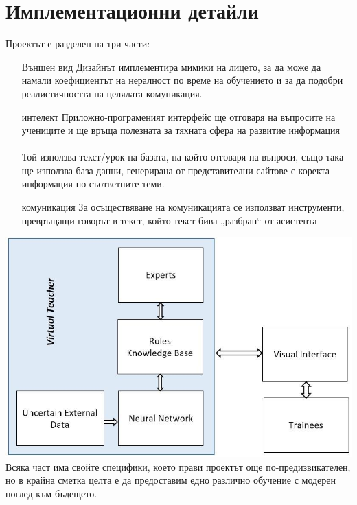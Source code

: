 \documentclass[a4paper, 12pt]{article}
\begin{document}
	\section{Имплементационни детайли}%
		Проектът е разделен на три части: %
		\begin{itemize}
			\item[Външен вид] Дизайнът имплементира мимики на лицето, за да може да намали коефициентът на нералност по време на обучението и за да подобри реалистичността на целялата комуникация. 
			\item[интелект] Приложно-програменият интерфейс ще отговаря на въпросите на учениците и ще връща полезната за тяхната сфера на развитие информация \\ \\ Той използва текст/урок на базата, на който отговаря на въпроси, също така ще използва база данни, генерирана от представителни сайтове с коректа информация по съответните теми.
			\item[комуникация] За осъществяване на комуникацията се използват инструменти, превръщащи говорът в текст, който текст бива „разбран“ от асистента 
		\end{itemize}
		{\centering
			\includegraphics[width=\textwidth]{../schema.jpg}
		}
		Всяка част има свойте специфики, което прави проектът още по-предизвикателен, но в крайна сметка целта е да предоставим едно различно обучение с модерен поглед към бъдещето.
\end{document}
